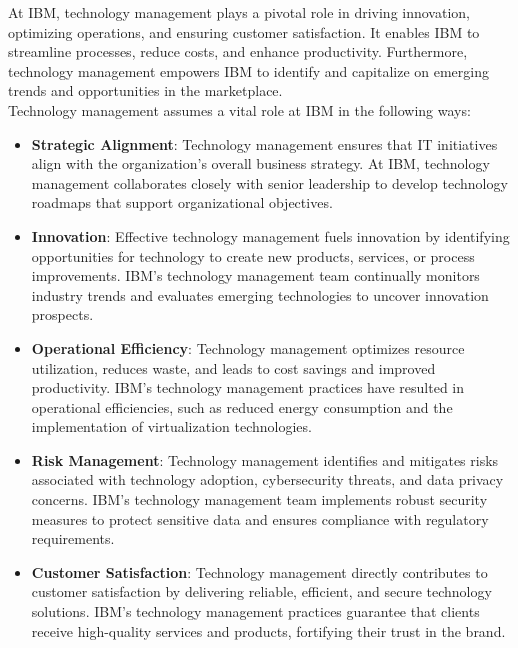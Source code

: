 At IBM, technology management plays a pivotal role in driving innovation, optimizing operations, and ensuring customer satisfaction. It enables IBM to streamline processes, reduce costs, and enhance productivity. Furthermore, technology management empowers IBM to identify and capitalize on emerging trends and opportunities in the marketplace.\\

Technology management assumes a vital role at IBM in the following ways:
\begin{itemize}
    \item \textbf{Strategic Alignment}:
Technology management ensures that IT initiatives align with the organization's overall business strategy.
At IBM, technology management collaborates closely with senior leadership to develop technology roadmaps that support organizational objectives.

    
    \item \textbf{Innovation}:
Effective technology management fuels innovation by identifying opportunities for technology to create new products, services, or process improvements.
IBM's technology management team continually monitors industry trends and evaluates emerging technologies to uncover innovation prospects.

    
    \item \textbf{Operational Efficiency}:
Technology management optimizes resource utilization, reduces waste, and leads to cost savings and improved productivity.
IBM's technology management practices have resulted in operational efficiencies, such as reduced energy consumption and the implementation of virtualization technologies.

    
    \item \textbf{Risk Management}:
Technology management identifies and mitigates risks associated with technology adoption, cybersecurity threats, and data privacy concerns.
IBM's technology management team implements robust security measures to protect sensitive data and ensures compliance with regulatory requirements.

    
    \item \textbf{Customer Satisfaction}:
Technology management directly contributes to customer satisfaction by delivering reliable, efficient, and secure technology solutions.
IBM's technology management practices guarantee that clients receive high-quality services and products, fortifying their trust in the brand.

  \end{itemize}
  
